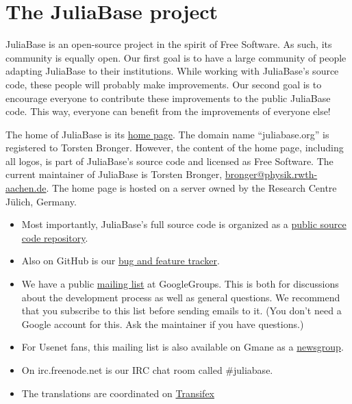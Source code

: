 \documentclass[a4paper,11pt,english]{sphinxmanual}
\begin{document}

\chapter{The JuliaBase project}
\label{project:index-0}\label{project:the-juliabase-project}\label{project::doc}
JuliaBase is an open-source project in the spirit of Free Software.  As such,
its community is equally open.  Our first goal is to have a large community of
people adapting JuliaBase to their institutions.  While working with
JuliaBase's source code, these people will probably make improvements.  Our
second goal is to encourage everyone to contribute these improvements to the
public JuliaBase code.  This way, everyone can benefit from the improvements of
everyone else!

The home of JuliaBase is its \href{http://www.juliabase.org}{home page}.  The domain name “juliabase.org” is
registered to Torsten Bronger.  However, the content of the home page,
including all logos, is part of JuliaBase's source code and licensed as Free
Software.  The current maintainer of JuliaBase is Torsten Bronger,
\href{mailto:bronger@physik.rwth-aachen.de}{bronger@physik.rwth-aachen.de}.  The home page is hosted on a server owned by
the Research Centre Jülich, Germany.
\begin{itemize}
\item {} 
Most importantly, JuliaBase's full source code is organized as a \href{https://github.com/juliabase}{public
source code repository}.

\item {} 
Also on GitHub is our \href{https://github.com/juliabase/juliabase/issues}{bug and feature tracker}.

\item {} 
We have a public \href{https://groups.google.com/forum/?hl=de\#!forum/juliabase}{mailing list} at GoogleGroups.  This is both for
discussions about the development process as well as general questions.  We
recommend that you subscribe to this list before sending emails to it.  (You
don't need a Google account for this.  Ask the maintainer if you have
questions.)

\item {} 
For Usenet fans, this mailing list is also available on Gmane as a
\href{http://dir.gmane.org/gmane.comp.db.juliabase}{newsgroup}.

\item {} 
On irc.freenode.net is our IRC chat room called \#juliabase.

\item {} 
The translations are coordinated on \href{https://www.transifex.com/organization/juliabase/dashboard/juliabase}{Transifex}

\end{itemize}
\end{document}
